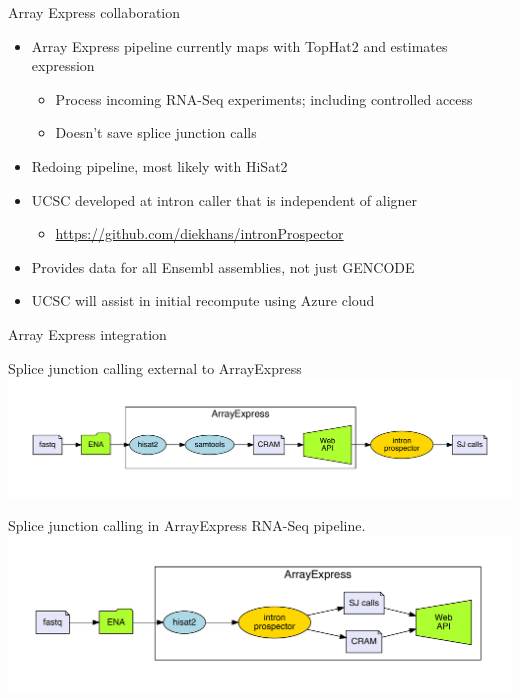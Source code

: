 \documentclass[10pt,
               hyperref={bookmarks=false,
                         bookmarksopen=false,
                         colorlinks=true,
                         linkcolor=blue,
                         urlcolor=blue},
               xcolor={svgnames,table}]{beamer}
\newenvironment{tightitemize}{%
\begin{itemize}
  \setlength{\itemsep}{1pt}%
  \setlength{\parskip}{0pt}%
  \setlength{\parsep}{0pt}%
}{\end{itemize}}
\begin{document}
\begin{frame}{Array Express collaboration}
  \begin{itemize}
  \item Array Express pipeline currently maps with TopHat2 and estimates expression
    \begin{tightitemize}
    \item Process incoming RNA-Seq experiments; including controlled access
    \item Doesn't save splice junction calls
    \end{tightitemize}
  \item Redoing pipeline, most likely with HiSat2
  \item UCSC developed at intron caller that is independent of aligner
    \begin{tightitemize}
    \item \url{https://github.com/diekhans/intronProspector}
    \end{tightitemize}
  \item Provides data for all Ensembl assemblies, not just GENCODE
  \item UCSC will assist in initial recompute using Azure cloud
  \end{itemize}
\end{frame}

\begin{frame}{Array Express integration}
  \begin{center}
    Splice junction calling external to ArrayExpress
    \includegraphics[scale=0.42]{images/calling_external.pdf}

    Splice junction calling in ArrayExpress RNA-Seq pipeline.
    \includegraphics[scale=0.42]{images/calling_at_array_express.pdf}
  \end{center}
\end{frame}
\end{document}
